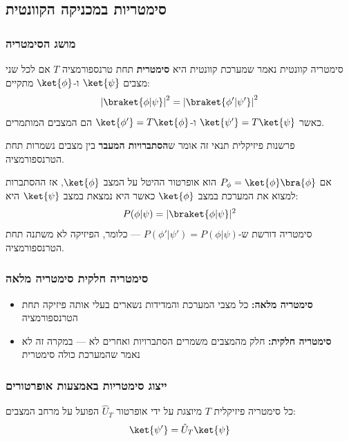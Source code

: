 \subsection{סימטריות במכניקה הקוונטית}

\subsubsection*{מושג הסימטריה}

\begin{definitionbox}{סימטריה קוונטית}
נאמר שמערכת קוונטית היא \textbf{סימטרית} תחת טרנספורמציה $T$ אם לכל שני מצבים $\ket{\psi}$ ו-$\ket{\phi}$ מתקיים:
\[
\left|\braket{\phi|\psi}\right|^{2}=\left|\braket{\phi'|\psi'}\right|^2
\]
כאשר $\ket{\psi'} = T\ket{\psi}$ ו-$\ket{\phi'} = T\ket{\phi}$ הם המצבים המותמרים.
\end{definitionbox}

\begin{notebox}{פרשנות פיזיקלית}
תנאי זה אומר ש\textbf{הסתברויות המעבר} בין מצבים נשמרות תחת הטרנספורמציה. 

אם $P_\phi = \ket{\phi}\bra{\phi}$ הוא אופרטור ההיטל על המצב $\ket{\phi}$, אז ההסתברות למצוא את המערכת במצב $\ket{\phi}$ כאשר היא נמצאת במצב $\ket{\psi}$ היא:
\[
P(\phi|\psi) = |\braket{\phi|\psi}|^2
\]
סימטריה דורשת ש-$P(\phi'|\psi') = P(\phi|\psi)$ — כלומר, הפיזיקה לא משתנה תחת הטרנספורמציה.
\end{notebox}

\subsubsection*{סימטריה חלקית  סימטריה מלאה}

\begin{itemize}
    \item \textbf{סימטריה מלאה:} כל מצבי המערכת והמדידות נשארים בעלי אותה פיזיקה תחת הטרנספורמציה
    \item \textbf{סימטריה חלקית:} חלק מהמצבים משמרים הסתברויות ואחרים לא — במקרה זה לא נאמר שהמערכת כולה סימטרית
\end{itemize}

\subsubsection*{ייצוג סימטריות באמצעות אופרטורים}

כל סימטריה פיזיקלית $T$ מיוצגת על ידי אופרטור $\hat{U}_T$ הפועל על מרחב המצבים:
\[
\ket{\psi'} = \hat{U}_T\ket{\psi}
\]

